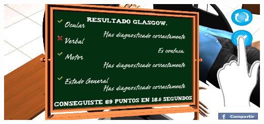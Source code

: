 \begin{frame}
\begin{overprint}
 \includegraphics[width=\textwidth]{imagenes/flujo/flujo17.png}





\end{overprint}
\end{frame}
